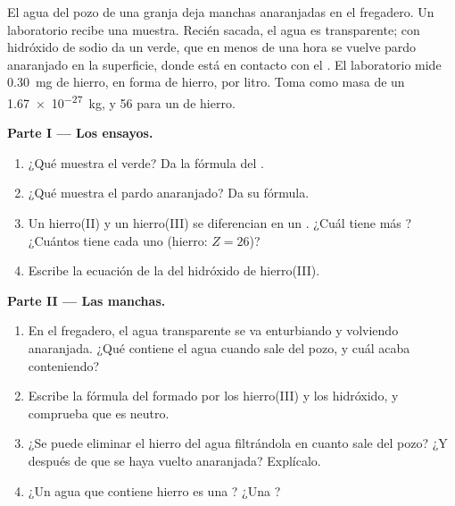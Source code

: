 \begin{problem}
\label{pb:g9:ions:1}
El agua del pozo de una granja deja manchas anaranjadas en el
fregadero. Un laboratorio recibe una muestra. Recién sacada, el agua es
transparente; con hidróxido de sodio da un  verde, que en
menos de una hora se vuelve pardo anaranjado en la superficie, donde
está en contacto con el . El laboratorio mide \qty{0.30}{mg} de
hierro, en forma de  hierro, por litro. Toma como masa de un
 \qty{1.67e-27}{kg}, y 56  para un  de hierro.

\medskip
\noindent\textbf{Parte I --- Los ensayos.}
\begin{enumerate}
  \item ¿Qué  muestra el  verde? Da la fórmula del
        .
  \item ¿Qué  muestra el  pardo anaranjado? Da su
        fórmula.
  \item Un  hierro(II) y un  hierro(III) se diferencian en un
        . ¿Cuál tiene más ? ¿Cuántos  tiene
        cada uno (hierro: $Z = 26$)?
  \item Escribe la ecuación de la  del hidróxido de
        hierro(III).
\end{enumerate}

\medskip
\noindent\textbf{Parte II --- Las manchas.}
\begin{enumerate}[resume]
  \item En el fregadero, el agua transparente se va enturbiando y
        volviendo anaranjada. ¿Qué  contiene el agua cuando sale del
        pozo, y cuál acaba conteniendo?
  \item Escribe la fórmula del  formado por los 
        hierro(III) y los  hidróxido, y comprueba que es neutro.
  \item ¿Se puede eliminar el hierro del agua filtrándola en cuanto sale
        del pozo? ¿Y después de que se haya vuelto anaranjada?
        Explícalo.
  \item ¿Un agua que contiene  hierro es una ? ¿Una
        ?
\end{enumerate}


\end{problem}
